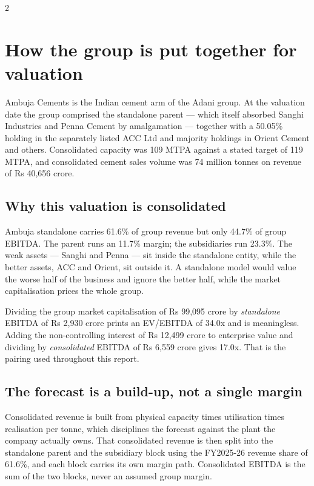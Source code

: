 \begin{paracol}{2}
\section{How the group is put together for valuation}

Ambuja Cements is the Indian cement arm of the Adani group. At the valuation date
the group comprised the standalone parent — which itself absorbed Sanghi Industries
and Penna Cement by amalgamation — together with a 50.05\% holding in the separately
listed ACC Ltd and majority holdings in Orient Cement and others. Consolidated
capacity was 109 MTPA against a stated target of 119 MTPA, and consolidated cement
sales volume was 74 million tonnes on revenue of Rs 40,656 crore.

\subsection{Why this valuation is consolidated}

Ambuja standalone carries 61.6\% of group revenue but only 44.7\% of group EBITDA.
The parent runs an 11.7\% margin; the subsidiaries run 23.3\%. The weak assets —
Sanghi and Penna — sit inside the standalone entity, while the better assets, ACC
and Orient, sit outside it. A standalone model would value the worse half of the
business and ignore the better half, while the market capitalisation prices the
whole group.

\begin{warnbox}
Dividing the group market capitalisation of Rs 99,095 crore by \emph{standalone}
EBITDA of Rs 2,930 crore prints an EV/EBITDA of 34.0x and is meaningless. Adding
the non-controlling interest of Rs 12,499 crore to enterprise value and dividing by
\emph{consolidated} EBITDA of Rs 6,559 crore gives 17.0x. That is the pairing used
throughout this report.
\end{warnbox}

\subsection{The forecast is a build-up, not a single margin}

Consolidated revenue is built from physical capacity times utilisation times
realisation per tonne, which disciplines the forecast against the plant the company
actually owns. That consolidated revenue is then split into the standalone parent
and the subsidiary block using the FY2025-26 revenue share of 61.6\%, and each block
carries its own margin path. Consolidated EBITDA is the sum of the two blocks, never
an assumed group margin.


\end{paracol}
